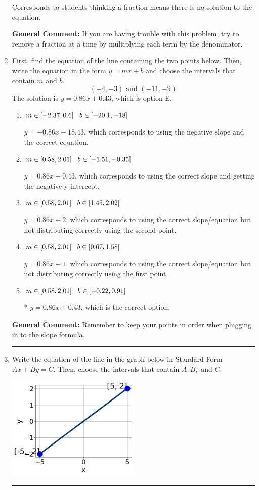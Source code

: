 \documentclass{extbook}[14pt]
\newcommand{\litem}[1]{\item #1

\rule{\textwidth}{0.4pt}}
\begin{document}
\begin{enumerate}
{\begin{enumerate}[label=\Alph*.]
Corresponds to students thinking a fraction means there is no solution to the equation.
\end{enumerate}

\textbf{General Comment:} If you are having trouble with this problem, try to remove a fraction at a time by multiplying each term by the denominator.
}
\litem{
First, find the equation of the line containing the two points below. Then, write the equation in the form $ y=mx+b $ and choose the intervals that contain $m$ and $b$.
\[ (-4, -3) \text{ and } (-11, -9) \]The solution is \( y = 0.86x + 0.43 \), which is option E.\begin{enumerate}[label=\Alph*.]
\item \( m \in [-2.37, 0.6] \hspace*{3mm} b \in [-20.1, -18] \)

 $y = -0.86x -18.43$, which corresponds to using the negative slope and the correct equation.
\item \( m \in [0.58, 2.01] \hspace*{3mm} b \in [-1.51, -0.35] \)

 $y = 0.86x -0.43$, which corresponds to using the correct slope and getting the negative y-intercept.
\item \( m \in [0.58, 2.01] \hspace*{3mm} b \in [1.45, 2.02] \)

 $y = 0.86x + 2$, which corresponds to using the correct slope/equation but not distributing correctly using the second point.
\item \( m \in [0.58, 2.01] \hspace*{3mm} b \in [0.67, 1.58] \)

 $y = 0.86x + 1$, which corresponds to using the correct slope/equation but not distributing correctly using the first point.
\item \( m \in [0.58, 2.01] \hspace*{3mm} b \in [-0.22, 0.91] \)

* $y = 0.86x + 0.43$, which is the correct option.
\end{enumerate}

\textbf{General Comment:} Remember to keep your points in order when plugging in to the slope formula.
}
\litem{
Write the equation of the line in the graph below in Standard Form $Ax+By=C$. Then, choose the intervals that contain $A, B, \text{ and } C$.

\begin{center}
    \includegraphics[width=0.5\textwidth]{../Figures/linearGraphToStandardC.png}
\end{center}


}
\end{enumerate}
\end{document}
